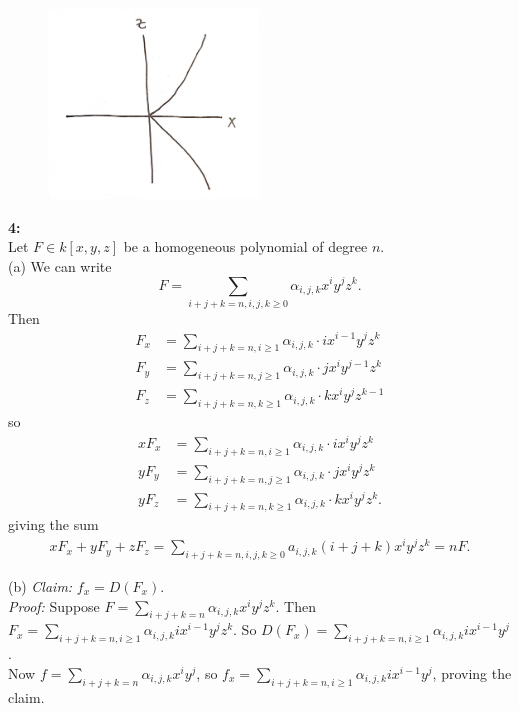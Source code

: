 \documentclass[a4paper]{article}
\begin{document}
 \begin{figure}[H]
     \centering
     \includegraphics[width=0.5\textwidth]{3d.jpeg}
     \label{fig:3d-jpeg}
 \end{figure}

 \textbf{4:}\\
 Let $F \in k\left[ x,y,z \right] $ be a homogeneous polynomial of degree
 $n$.\\ 
 (a) We can write
 \[
     F = \sum_{i+j+k = n, i,j,k\ge 0} \alpha_{i,j,k} x^{i}y^{j}z^{k}.
 \] 
 Then 
 \begin{align*}
     F_x &= \sum_{i+j+k=n, i\ge 1} \alpha_{i,j,k}\cdot i x^{i-1}y^{j}z^{k}\\
     F_y &= \sum_{i+j+k=n, j\ge 1} \alpha_{i,j,k}\cdot j x^{i}y^{j-1}z^{k}\\
     F_z &= \sum_{i+j+k=n, k\ge 1} \alpha_{i,j,k}\cdot k x^{i}y^{j}z^{k-1}
 \end{align*}
 so
 \begin{align*}
     x F_x &= \sum_{i+j+k=n, i\ge 1} \alpha_{i,j,k}\cdot i x^{i}y^{j}z^{k}\\
     yF_y &= \sum_{i+j+k=n, j\ge 1} \alpha_{i,j,k}\cdot j x^{i}y^{j}z^{k}\\
     yF_z &= \sum_{i+j+k=n, k\ge 1} \alpha_{i,j,k}\cdot k x^{i}y^{j}z^{k}.
 \end{align*}
giving the sum
\begin{align*}
    xF_x + y F_y + z F_z = \sum_{i+j+k = n, i,j,k\ge 0}
    a_{i,j,k} (i+j+k) x^{i} y^{j} z^{k}
    = n F.
\end{align*}

(b) 
\textit{Claim:} $f_x = D(F_x)$.\\
\textit{Proof:} Suppose $F = \sum_{i+j+k = n}
\alpha_{i,j,k} x^{i}y^{j}z^{k}$. Then
$F_x = \sum_{i+j+k = n, i \ge 1} \alpha_{i,j,k}i x^{i-1}y^{j}z^{k}$. So
$D(F_x) = \sum_{i+j+k = n, i\ge 1} \alpha_{i,j,k}i x^{i-1}y^{j}$.\\
Now $f = \sum_{i+j+k = n} \alpha_{i,j,k} x^{i}y^{j}$, so
$f_x = \sum_{i+j+k = n, i \ge 1} \alpha_{i,j,k} i x^{i-1}y^{j}$, proving the
claim.\\
\linebreak
\end{document}
